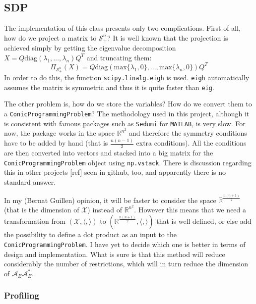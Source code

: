 \documentclass[paper=a4, fontsize=11pt]{scrartcl}
\numberwithin{equation}{section}		%
\numberwithin{figure}{section}			%
\numberwithin{table}{section}				%
\begin{document}
\subsection{SDP}
The implementation of this class presents only two complications. First of all, how do we project a matrix to $\mathcal{S}^n_+$? It is well known that the projection is achieved simply by getting the eigenvalue decomposition $X = Q\text{diag}(\lambda_1,\dots,\lambda_n)Q^T$ and truncating them:
\begin{equation}
\Pi_{\mathcal{S}^n_+}(X) = Q\text{diag}(\text{max}\{\lambda_1,0\},\dots,\text{max}\{\lambda_n,0\})Q^T
\end{equation}
In order to do this, the function \texttt{scipy.linalg.eigh} is used. \texttt{eigh} automatically assumes the matrix is symmetric and thus it is quite faster than \texttt{eig}.

The other problem is, how do we store the variables? How do we convert them to a \texttt{ConicProgrammingProblem}? The methodology used in this project, although it is consistent with famous packages such as \texttt{Sedumi} for \texttt{MATLAB}, is very slow. For now, the package works in the space $\mathbb{R}^{n^2}$ and therefore the symmetry conditions have to be added by hand (that is $\frac{n(n-1)}{2}$ extra conditions). All the conditions are then converted into vectors and stacked into a big matrix for the \texttt{ConicProgrammingProblem} object using \texttt{np.vstack}. There is discussion regarding this in other projects [ref] seen in github, too, and apparently there is no standard answer. 

In my (Bernat Guillen) opinion, it will be faster to consider the space $\mathbb{R}^{\frac{n(n+1)}{2}}$ (that is the dimension of $\mathcal{X}$) instead of $\mathbb{R}^{n^2}$. However this means that we need a transformation from $(\mathcal{X},\langle,\rangle)$ to $(\mathbb{R}^{\frac{n(n+1)}{2}},\langle,\rangle)$ that is well defined, or else add the possibility to define a dot product as an input to the  \texttt{ConicProgrammingProblem}. I have yet to decide which one is better in terms of design and implementation. What is sure is that this method will reduce considerably the number of restrictions, which will in turn reduce the dimension of $\mathcal{A}_E\mathcal{A}_E^*$.

\subsubsection{Profiling}
\end{document}

